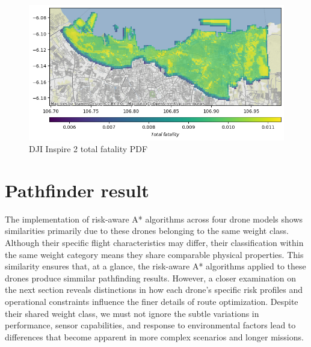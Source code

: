 \documentclass[12pt]{report}
\begin{document}
        \begin{figure}[H]
            \centering
            \includegraphics[width=\textwidth]{Plot/inspire/total_fatality_pdf.png}
            \caption{DJI Inspire 2 total fatality PDF}
        \end{figure}

    \section{Pathfinder result}
        The implementation of risk-aware A* algorithms across four drone models shows similarities primarily due to
        these drones belonging to the same weight class. Although their specific flight characteristics may differ,
        their classification within the same weight category means they share comparable physical properties. This
        similarity ensures that, at a glance, the risk-aware A* algorithms applied to these drones produce simmilar
        pathfinding results. However, a closer examination on the next section reveals distinctions in how each drone's
        specific risk profiles and operational constraints influence the finer details of route optimization. Despite
        their shared weight class, we must not ignore the subtle variations in performance, sensor capabilities, and
        response to environmental factors lead to differences that become apparent in more complex scenarios and longer
        missions.
        
        \label{fig:regularastar}
\end{document}
